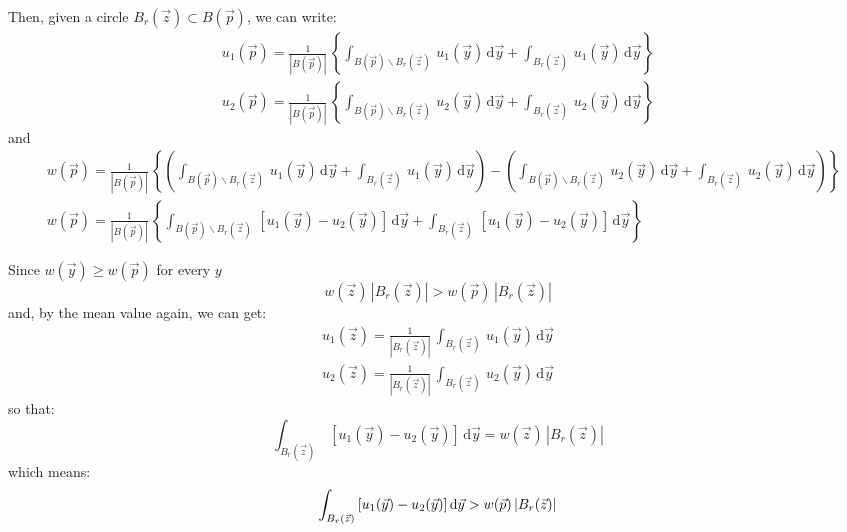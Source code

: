 \documentclass[../main.tex]{subfiles}
\begin{document}
Then, given a circle $B_{r}(\vec{z}) \subset B(\vec{p})$,
we can write:
\begin{align}
    u_1(\vec{p}) = \frac{1}{|B(\vec{p})|} \, \left\{ \int_{B(\vec{p}) \backslash B_r(\vec{z})} \, u_1(\vec{y}) \, \mathrm{d} \vec{y} + \int_{B_r(\vec{z})} \, u_1(\vec{y}) \, \mathrm{d} \vec{y} \right\} \\
    u_2(\vec{p}) = \frac{1}{|B(\vec{p})|} \, \left\{ \int_{B(\vec{p}) \backslash B_r(\vec{z})} \, u_2(\vec{y}) \, \mathrm{d} \vec{y} + \int_{B_r(\vec{z})} \, u_2(\vec{y}) \, \mathrm{d} \vec{y} \right\}
\end{align}
and
\begin{align}
    & w(\vec{p}) = \frac{1}{|B(\vec{p})|} \, \left\{ \left( \int_{B(\vec{p}) \backslash B_r(\vec{z})} \, u_1(\vec{y}) \, \mathrm{d} \vec{y} + \int_{B_r(\vec{z})} \, u_1(\vec{y}) \, \mathrm{d} \vec{y} \right) - \left(\int_{B(\vec{p}) \backslash B_r(\vec{z})} \, u_2(\vec{y}) \, \mathrm{d} \vec{y} + \int_{B_r(\vec{z})} \, u_2(\vec{y}) \, \mathrm{d} \vec{y} \right) \right\} \\
    & w(\vec{p}) = \frac{1}{|B(\vec{p})|} \, \left\{ \int_{B(\vec{p}) \backslash B_r(\vec{z})} \, [u_1(\vec{y}) - u_2(\vec{y})] \, \mathrm{d} \vec{y} + \int_{B_r(\vec{z})} \, [u_1(\vec{y}) -  u_2(\vec{y})] \, \mathrm{d} \vec{y} \right\}
\end{align}

Since $w(\vec{y}) \geqslant w(\vec{p})$ for every $y$ 
\begin{equation}
    w(\vec{z}) \, |B_r(\vec{z})| > w(\vec{p}) \, |B_r(\vec{z})|
\end{equation}
and, by the mean value again, we can get:
\begin{align}
    u_1(\vec{z}) = \frac{1}{|B_r(\vec{z})|} \, \int_{B_r(\vec{z})} \, u_1(\vec{y}) \, \mathrm{d} \vec{y} \\
    u_2(\vec{z}) = \frac{1}{|B_r(\vec{z})|} \, \int_{B_r(\vec{z})} \, u_2(\vec{y}) \, \mathrm{d} \vec{y}
\end{align}
so that:
\begin{equation}
     \int_{B_r(\vec{z})} \, [u_1(\vec{y}) - u_2(\vec{y})] \, \mathrm{d} \vec{y} = w(\vec{z}) \, |B_r(\vec{z})|
\end{equation}
which means:
\begin{equation}
    \int_{B_r(\vec{z})} \, [u_1(\vec{y}) - u_2(\vec{y})] \, \mathrm{d} \vec{y} > w(\vec{p}) \, |B_r(\vec{z})| \\
\end{equation}
\end{document}
